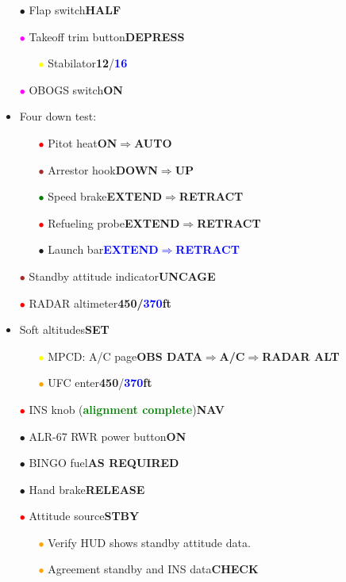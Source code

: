 \documentclass[a4paper,12pt,dvipsnames]{letter}
\newcommand{\button}[1]{\textbf{#1}}
\newcommand{\ok}[1]{\textcolor{Green}{\textbf{#1}}}
\newcommand{\boat}[1]{\textcolor{Blue}{\textbf{#1}}}
\newcommand{\bi}{\textcolor{ProcessBlue}{$\bullet$\;}}
\newcommand{\ri}{\textcolor{Red}{$\bullet$\;}}
\newcommand{\gi}{\textcolor{Green}{$\bullet$\;}}
\newcommand{\yi}{\textcolor{Yellow}{$\bullet$\;}}
\newcommand{\mi}{\textcolor{Magenta}{$\bullet$\;}}
\newcommand{\oi}{\textcolor{Orange}{$\bullet$\;}}
\newcommand{\ai}{\textcolor{Apricot}{$\bullet$\;}}
\renewcommand{\ni}{\textcolor{Brown}{$\bullet$\;}}
\begin{document}
{\begin{itemize}
 \item[\bi] Flap switch\dotfill\button{HALF}
 \item[\mi] Takeoff trim button\dotfill\button{DEPRESS}
 \begin{itemize}
  \item[\yi] Stabilator\dotfill\button{12\textdegree}/\boat{16\textdegree}
 \end{itemize}
 \item[\mi] OBOGS switch\dotfill\button{ON}
 \item Four down test:
 \begin{itemize}
  \item[\ri] Pitot heat\dotfill\button{ON\;$\Rightarrow$\;AUTO}
  \item[\ni] Arrestor hook\dotfill\button{DOWN\;$\Rightarrow$\;UP}
  \item[\gi] Speed brake\dotfill\button{EXTEND\;$\Rightarrow$\;RETRACT}
  \item[\ri] Refueling probe\dotfill\button{EXTEND\;$\Rightarrow$\;RETRACT}
  \item[\bi] Launch bar\dotfill\boat{EXTEND\;$\Rightarrow$\;RETRACT}
 \end{itemize}
 \item[\ni] Standby attitude indicator\dotfill\button{UNCAGE}
 \item[\ri] RADAR altimeter\dotfill\button{450/\boat{370}\;ft}
 \item Soft altitudes\dotfill\button{SET}
 \begin{itemize}
  \item[\yi] MPCD: A/C page\dotfill\button{OBS DATA\;$\Rightarrow$\;A/C\;$\Rightarrow$\;RADAR ALT}
  \item[\oi] UFC enter\dotfill\button{450}/\boat{370}\button{\;ft}
 \end{itemize}
 \item[\ri] INS knob (\ok{alignment complete})\dotfill\button{NAV}
 \item[\ai] ALR-67 RWR power button\dotfill\button{ON}
 \item[\bi] BINGO fuel\dotfill\button{AS REQUIRED} 
 \item[\bi] Hand brake\dotfill\button{RELEASE}
 \item[\ri] Attitude source\dotfill\button{STBY}
 \begin{itemize}
  \item[\oi] Verify HUD shows standby attitude data.
  \item[\oi] Agreement standby and INS data\dotfill\button{CHECK}

\end{itemize}
\end{itemize}}
\end{document}
